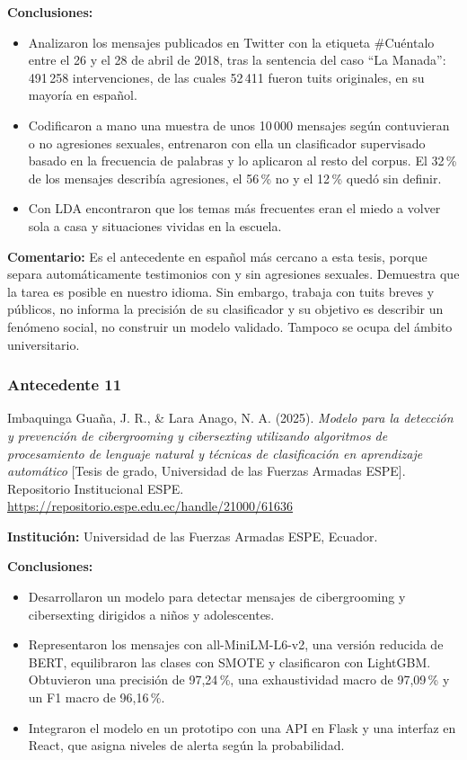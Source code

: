 \noindent\textbf{Conclusiones:}
\begin{itemize}
	\item Analizaron los mensajes publicados en Twitter con la etiqueta \#Cuéntalo entre el 26 y el 28 de abril de 2018, tras la sentencia del caso \enquote{La Manada}: 491\,258 intervenciones, de las cuales 52\,411 fueron tuits originales, en su mayoría en español.
	\item Codificaron a mano una muestra de unos 10\,000 mensajes según contuvieran o no agresiones sexuales, entrenaron con ella un clasificador supervisado basado en la frecuencia de palabras y lo aplicaron al resto del corpus. El 32\,\% de los mensajes describía agresiones, el 56\,\% no y el 12\,\% quedó sin definir.
	\item Con LDA encontraron que los temas más frecuentes eran el miedo a volver sola a casa y situaciones vividas en la escuela.
\end{itemize}

\noindent\textbf{Comentario:} Es el antecedente en español más cercano a esta tesis, porque separa automáticamente testimonios con y sin agresiones sexuales. Demuestra que la tarea es posible en nuestro idioma. Sin embargo, trabaja con tuits breves y públicos, no informa la precisión de su clasificador y su objetivo es describir un fenómeno social, no construir un modelo validado. Tampoco se ocupa del ámbito universitario.

\subsubsection{Antecedente 11}
\noindent Imbaquinga Guaña, J. R., \& Lara Anago, N. A. (2025). \textit{Modelo para la detección y prevención de cibergrooming y cibersexting utilizando algoritmos de procesamiento de lenguaje natural y técnicas de clasificación en aprendizaje automático} [Tesis de grado, Universidad de las Fuerzas Armadas ESPE]. Repositorio Institucional ESPE. \url{https://repositorio.espe.edu.ec/handle/21000/61636}

\noindent\textbf{Institución:} Universidad de las Fuerzas Armadas ESPE, Ecuador.

\noindent\textbf{Conclusiones:}
\begin{itemize}
	\item Desarrollaron un modelo para detectar mensajes de cibergrooming y cibersexting dirigidos a niños y adolescentes.
	\item Representaron los mensajes con all-MiniLM-L6-v2, una versión reducida de BERT, equilibraron las clases con SMOTE y clasificaron con LightGBM. Obtuvieron una precisión de 97,24\,\%, una exhaustividad macro de 97,09\,\% y un F1 macro de 96,16\,\%.
	\item Integraron el modelo en un prototipo con una API en Flask y una interfaz en React, que asigna niveles de alerta según la probabilidad.
\end{itemize}

